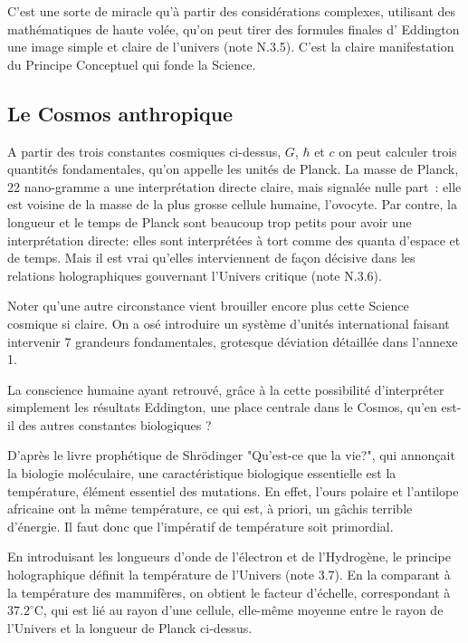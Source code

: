 \documentclass[a4paper,12pt]{article}
\begin{document}
C’est une sorte de miracle qu’à partir des considérations complexes, utilisant des mathématiques de haute volée, qu’on peut tirer des formules finales d’ Eddington une image simple et claire de l’univers (note N.3.5). C’est la claire manifestation du Principe Conceptuel qui fonde la Science.



\subsection{Le Cosmos anthropique}

A partir des trois constantes cosmiques ci-dessus, $G$, $\hbar$ et $c$ on peut calculer trois quantités fondamentales, qu'on appelle les unités de Planck. La masse de Planck, 22 nano-gramme a une interprétation directe claire, mais signalée nulle part : elle est voisine de la masse de la plus grosse cellule humaine, l'ovocyte. Par contre, la longueur et le temps de Planck sont beaucoup trop petits pour avoir une interprétation directe: elles sont interprétées à tort comme des quanta d'espace et de temps. Mais il est vrai qu'elles interviennent de façon décisive dans les relations holographiques gouvernant l'Univers critique (note N.3.6). 

Noter qu'une autre circonstance vient brouiller encore plus cette Science cosmique si claire. On a osé introduire un système d'unités international faisant intervenir 7 grandeurs fondamentales, grotesque déviation détaillée dans l'annexe 1. 

La conscience humaine ayant retrouvé, grâce à la cette possibilité d’interpréter simplement les résultats Eddington, une place centrale dans le Cosmos, qu'en est-il des autres constantes biologiques ?

D'après le livre prophétique de Shrödinger "Qu'est-ce que la vie?", qui annonçait la biologie moléculaire, une caractéristique biologique essentielle est la température, élément essentiel des mutations. En effet, l'ours polaire et l'antilope africaine ont la même température, ce qui est, à priori, un gâchis terrible d'énergie. Il faut donc que l'impératif de température soit primordial.

En introduisant les longueurs d'onde de l'électron et de l'Hydrogène, le principe holographique définit la température de l'Univers (note 3.7). En la comparant à la température des mammifères, on obtient le facteur d'échelle, correspondant à $37.2^{\circ}$C, qui est lié au rayon d'une cellule, elle-même moyenne entre le rayon de l'Univers et la longueur de Planck ci-dessus. 
\end{document}
